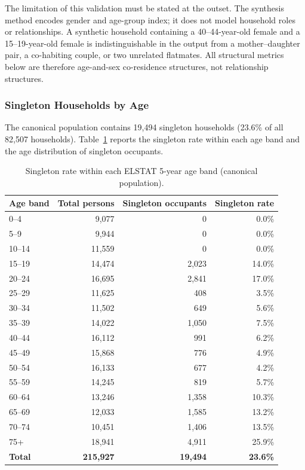 \documentclass{article}
\begin{document}
The limitation of this validation must be stated at the outset. The synthesis method encodes gender and age-group index; it does not model household roles or relationships. A synthetic household containing a 40--44-year-old female and a 15--19-year-old female is indistinguishable in the output from a mother--daughter pair, a co-habiting couple, or two unrelated flatmates. All structural metrics below are therefore age-and-sex co-residence structures, not relationship structures.

\subsubsection*{Singleton Households by Age}

The canonical population contains 19{,}494 singleton households (23.6\% of all 82{,}507 households). Table~\ref{tab:singleton_rates} reports the singleton rate within each age band and the age distribution of singleton occupants.

\begin{table}[htbp]
\centering
\caption{Singleton rate within each ELSTAT 5-year age band (canonical population).}
\label{tab:singleton_rates}
\small
\begin{tabular}{lrrr}
\toprule
Age band & Total persons & Singleton occupants & Singleton rate \\
\midrule
0--4   &  9,077 &     0 &  0.0\% \\
5--9   &  9,944 &     0 &  0.0\% \\
10--14 & 11,559 &     0 &  0.0\% \\
15--19 & 14,474 & 2,023 & 14.0\% \\
20--24 & 16,695 & 2,841 & 17.0\% \\
25--29 & 11,625 &   408 &  3.5\% \\
30--34 & 11,502 &   649 &  5.6\% \\
35--39 & 14,022 & 1,050 &  7.5\% \\
40--44 & 16,112 &   991 &  6.2\% \\
45--49 & 15,868 &   776 &  4.9\% \\
50--54 & 16,133 &   677 &  4.2\% \\
55--59 & 14,245 &   819 &  5.7\% \\
60--64 & 13,246 & 1,358 & 10.3\% \\
65--69 & 12,033 & 1,585 & 13.2\% \\
70--74 & 10,451 & 1,406 & 13.5\% \\
75+    & 18,941 & 4,911 & 25.9\% \\
\midrule
\textbf{Total} & \textbf{215,927} & \textbf{19,494} & \textbf{23.6\%} \\
\bottomrule
\end{tabular}
\end{table}
\end{document}
